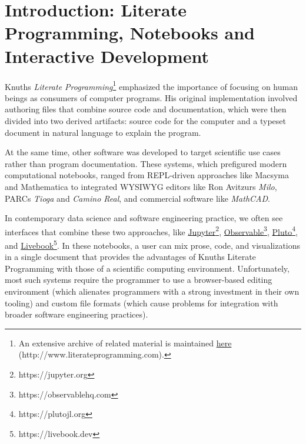 \documentclass[sigconf,screen,pbalance=true]{acmart}
\begin{document}

\maketitle

\hypertarget{introduction:-literate-programmingux2c-notebooks-and-interactive-development}{%
\section{Introduction: Literate Programming, Notebooks and Interactive Development}\label{introduction:-literate-programmingux2c-notebooks-and-interactive-development}}

Knuth\textquotesingle s \emph{Literate Programming}\footnote{An extensive archive of related material is maintained {\href{http://www.literateprogramming.com}{here} (http://www.literateprogramming.com)}.} \cite{Knuth_1984} emphasized the importance of focusing on human beings as consumers of computer programs. His original implementation involved authoring files that combine source code and documentation, which were then divided into two derived artifacts: source code for the computer and a typeset document in natural language to explain the program.

At the same time, other software was developed to target scientific use cases rather than program documentation. These systems, which prefigured modern computational notebooks, ranged from REPL-driven approaches like Macsyma and Mathematica to integrated WYSIWYG editors like Ron Avitzur\textquotesingle s \emph{Milo}, PARC\textquotesingle s \emph{Tioga} and \emph{Camino Real}, and commercial software like \emph{MathCAD}. \cite{Kajler_1998}

In contemporary data science and software engineering practice, we often see interfaces that combine these two approaches, like {\href{https://jupyter.org}{Jupyter}\footnote{https://jupyter.org}}, {\href{https://observablehq.com}{Observable}\footnote{https://observablehq.com}}, {\href{https://plutojl.org}{Pluto}\footnote{https://plutojl.org}}, and {\href{https://livebook.dev}{Livebook}\footnote{https://livebook.dev}}. In these notebooks, a user can mix prose, code, and visualizations in a single document that provides the advantages of Knuth\textquotesingle s Literate Programming with those of a scientific computing environment. Unfortunately, most such systems require the programmer to use a browser-based editing environment (which alienates programmers with a strong investment in their own tooling) and custom file formats (which cause problems for integration with broader software engineering practices). \cite{Chattopadhyay_2020}
\end{document}
